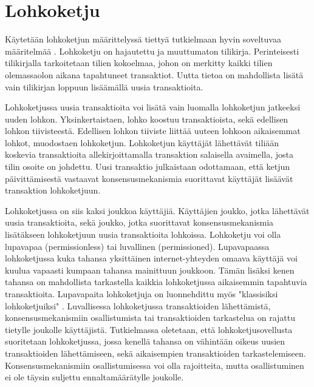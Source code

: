 
\section{Lohkoketju}

Käytetään lohkoketjun määrittelyssä tiettyä tutkielmaan hyvin soveltuvaa määritelmää \cite{8760539}.
Lohkoketju on hajautettu ja muuttumaton tilikirja. Perinteisesti tilikirjalla tarkoitetaan tilien kokoelmaa, johon on merkitty kaikki tilien olemassaolon aikana tapahtuneet transaktiot. Uutta tietoa on mahdollista lisätä vain tilikirjan loppuun lisäämällä uusia transaktioita.

Lohkoketjussa uusia transaktioita voi lisätä vain luomalla lohkoketjun jatkeeksi uuden lohkon. Yksinkertaistaen, lohko koostuu transaktioista, sekä edellisen lohkon tiivisteestä. Edellisen lohkon tiiviste liittää uuteen lohkoon aikaisemmat lohkot, muodostaen lohkoketjun. Lohkoketjun käyttäjät lähettävät tiliään koskevia transaktioita allekirjoittamalla transaktion salaisella avaimella, josta tilin osoite on johdettu. Uusi transaktio julkaistaan odottamaan, että ketjun päivittämisestä vastaavat konsensusmekanismia suorittavat käyttäjät lisäävät transaktion lohkoketjuun. 

Lohkoketjussa on siis kaksi joukkoa käyttäjiä. Käyttäjien joukko, jotka lähettävät uusia transaktioita, sekä joukko, jotka suorittavat konsensusmekanismia lisätäkseen lohkoketjuun uusia transaktioita lohkoissa. Lohkoketju voi olla lupavapaa (permissionless) tai luvallinen (permissioned). Lupavapaassa lohkoketjussa kuka tahansa yksittäinen internet-yhteyden omaava käyttäjä voi kuulua vapaasti kumpaan tahansa mainittuun joukkoon. Tämän lisäksi kenen tahansa on mahdollista tarkastella kaikkia lohkoketjussa aikaisemmin tapahtuvia transaktioita. Lupavapaita lohkoketjuja on luonnehdittu myös "klassisiksi lohkoketjuiksi" \cite{8760539}. Luvallisessa lohkoketjussa transaktioiden lähettämistä, konsensusmekanismiin osallistumista tai transaktioiden tarkastelua on rajattu tietylle joukolle käyttäjistä. Tutkielmassa oletetaan, että lohkoketjusovellusta suoritetaan lohkoketjussa, jossa kenellä tahansa on vähintään oikeus uusien transaktioiden lähettämiseen, sekä aikaisempien transaktioiden tarkastelemiseen. Konsensusmekanismiin osallistumisessa voi olla rajoitteita, mutta osallistuminen ei ole täysin suljettu ennaltamäärätylle joukolle.

